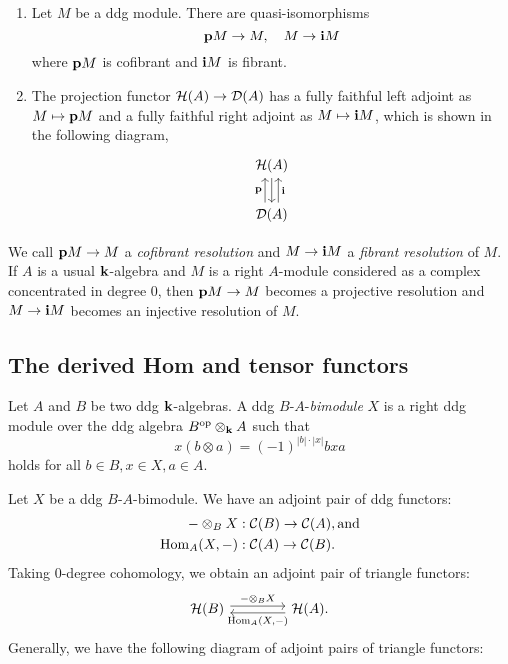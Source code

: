 \begin{proposition}\cite{K1}
  \begin{enumerate}
    \item Let $M$ be a ddg module.
      There are quasi-isomorphisms
      \[ \mathbf{p} M \to M, \quad M \to \mathbf{i} M\]
      where $\mathbf{p} M$ is cofibrant and $\mathbf{i} M$ is fibrant.
    \item The projection functor $\mathcal{H}(A) \to \operatorname{\mathcal{D}}(A)$
      has a fully faithful left adjoint as $M \mapsto \mathbf{p} M$
      and a fully faithful right adjoint as $M \mapsto \mathbf{i} M$,
      which is shown in the following diagram,
      \[
        \begin{tikzcd}
          \mathcal{H}(A) \ar[d] \\
          \D(A) \ar[u, shift left=2, "\Bp"] \ar[u, shift right=2, "\Bi"']
        \end{tikzcd}
      \]
  \end{enumerate}
\end{proposition}
We call $\mathbf{p} M \to M$ a \textit{cofibrant resolution}
and $M \to \mathbf{i} M$ a \textit{fibrant resolution} of $M$.
If $A$ is a usual $\mathbf{k}$-algebra and $M$ is a right $A$-module
considered as a complex concentrated in degree $0$,
then $\mathbf{p} M \to M$ becomes a projective resolution
and $M \to \mathbf{i} M$ becomes an injective resolution of $M$.

\subsection{The derived Hom and tensor functors}
Let $A$ and $B$ be two ddg $\mathbf{k}$-algebras.
A ddg $B$-$A$-\textit{bimodule} $X$ is a right ddg module
over the ddg algebra $B^{\rm op} \otimes_{\mathbf{k}} A$ such that
\[ x(b \otimes a) = (-1)^{|b| \cdot |x|}bxa \]
holds for all $b \in B, x \in X, a \in A$.

Let $X$ be a ddg $B$-$A$-bimodule. We have an adjoint pair of ddg functors:
\begin{align*}
  - \otimes_B X&: \operatorname{\mathcal{C}}(B) \to \operatorname{\mathcal{C}}(A), \text{and}\\
  \operatorname{Hom}_A(X, -)&: \operatorname{\mathcal{C}}(A) \to \operatorname{\mathcal{C}}(B).
\end{align*}
Taking $0$-degree cohomology, we obtain an adjoint pair of triangle functors:
\[
  \begin{tikzcd}[column sep=4em, every arrow/.append style=shift left]
    \mathcal{H}(B) \ar[r, "- \otimes_B X"]
    & \mathcal{H}(A). \ar[l, "{\Hom_A(X, -)}"]
  \end{tikzcd}
\]
Generally, we have the following diagram of adjoint pairs of triangle functors:

